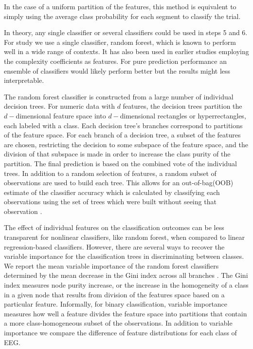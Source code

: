 In the case of a uniform partition of the features, this
method is equivalent to simply using the average class probability for each segment to classify the trial.


In theory, any single classifier or several classifiers could be used in steps 5 and 6.  For study we use a single classifier, random forest, which is known to perform well in a wide range of contexts. It has also been used in earlier studies employing the complexity coefficients as features. For pure prediction performance an  
ensemble of classifiers would likely perform better but the results 
might less interpretable.

The random forest classifier is constructed from a large number of individual decision trees. For numeric data with $d$ features, the decision trees partition the $d-$dimensional feature space into $d-$dimensional rectangles or hyperrectangles, each labeled with a class\cite{friedman2001}. Each decision tree's branches correspond to partitions of the feature space. For each branch of a decision tree, a subset of the features are chosen, restricting the decision to some subspace of the
feature space, and the division of that subspace is made in order to increase the class purity of the partition. The final prediction is based on the combined vote of the individual trees. In addition to a random selection of features, a random subset of observations are used to build each tree. This allows for an out-of-bag(OOB) estimate of the classifier 
accuracy which is calculated by classifying each observations using the set of trees which were built without seeing that observation \cite{breiman2001}.

The effect of individual features on the classification outcomes
can be less transparent for nonlinear classifiers, like random forest,
when compared to linear regression-based classifiers. However, there
are several ways to recover the variable importance for the 
classification trees in discriminating between classes. 
We report the mean variable importance of the random forest classifiers determined by the mean decrease in the 
Gini index across all branches
\cite{breiman2001}. The Gini index measures node purity increase, or 
the increase in the homogeneity of a class in a given node that 
results from division of the features space based on a particular
feature. Informally, for binary 
classification, variable importance measures how well a feature divides the feature space into partitions that contain a more class-homogeneous subset of the observations. In addition to variable importance we 
compare the difference of feature distributions for each class of EEG.

